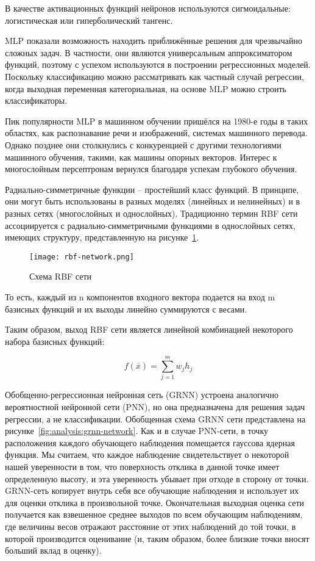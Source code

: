 В качестве активационных функций нейронов используются сигмоидальные: логистическая или гиперболический тангенс.

MLP показали возможность находить приближённые решения для чрезвычайно сложных задач. В частности, они являются
универсальным аппроксиматором функций, поэтому с успехом используются в построении регрессионных моделей.
Поскольку классификацию можно рассматривать как частный случай регрессии, когда выходная переменная категориальная,
на основе MLP можно строить классификаторы.

Пик популярности MLP в машинном обучении пришёлся на 1980-е годы в таких областях, как распознавание речи и
изображений, системах машинного перевода. Однако позднее они столкнулись с конкуренцией с другими технологиями
машинного обучения, такими, как машины опорных векторов. Интерес к многослойным персептронам вернулся благодаря
успехам глубокого обучения.

Радиально-симметричные функции – простейший класс функций. \linebreak В принципе, они могут быть использованы в разных моделях
(линейных и нелинейных) и в разных сетях (многослойных и однослойных). Традиционно термин RBF сети ассоциируется с
радиально-симметричными функциями в однослойных сетях, имеющих структуру, представленную на рисунке~\ref{fig:analysis:rbf-network}.

\begin{figure}[!ht]
  \centering
  \texttt{[image: rbf-network.png]} 
  \caption{Схема RBF сети}
  \label{fig:analysis:rbf-network}
\end{figure}

То есть, каждый из n компонентов входного вектора подается на вход m базисных функций и их выходы линейно суммируются
с весами. \pagebreak

Таким образом, выход RBF сети является линейной комбинацией некоторого набора базисных функций:

\begin{equation}
  f(\overline{x}) = \sum_{j=1}^{m}{w_jh_j}
\end{equation}

Обобщенно-регрессионная нейронная сеть (GRNN) устроена аналогично вероятностной нейронной сети (PNN), но она
предназначена для решения задач регрессии, а не классификации. Обобщенная схема GRNN сети представлена на
рисунке~\ref{fig:analysis:grnn-network}. Как и в случае PNN-сети, в точку расположения каждого
обучающего наблюдения помещается гауссова ядерная функция. Мы считаем, что каждое наблюдение свидетельствует о
некоторой нашей уверенности в том, что поверхность отклика в данной точке имеет определенную высоту, и эта
уверенность убывает при отходе в сторону от точки. GRNN-сеть копирует внутрь себя все обучающие наблюдения и
использует их для оценки отклика в произвольной точке. Окончательная выходная оценка сети получается как взвешенное
среднее выходов по всем обучающим наблюдениям, где величины весов отражают расстояние от этих наблюдений до той точки,
в которой производится оценивание (и, таким образом, более близкие точки вносят больший вклад в оценку).

